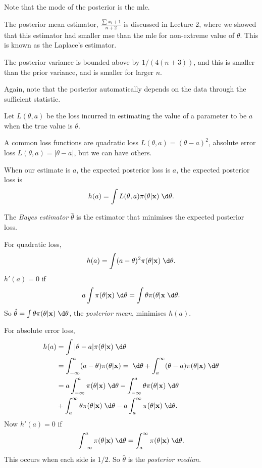\documentclass[a4paper]{article}
\begin{document}
Note that the mode of the posterior is the mle.

The posterior mean estimator, $\frac{\sum x_i + 1}{n + 2}$ is discussed in Lecture 2, where we showed that this estimator had smaller mse than the mle for non-extreme value of $\theta$. This is known as the Laplace's estimator.

The posterior variance is bounded above by $1/(4(n + 3))$, and this is smaller than the prior variance, and is smaller for larger $n$.

Again, note that the posterior automatically depends on the data through the sufficient statistic.

Let $L(\theta, a)$ be the loss incurred in estimating the value of a parameter to be $a$ when the true value is $\theta$.

A common loss functions are quadratic loss $L(\theta, a) = (\theta - a)^2$, absolute error loss $L(\theta, a) = |\theta - a|$, but we can have others.

When our estimate is $a$, the expected posterior loss is $a$, the expected posterior loss is
\[
  h(a) = \int L(\theta, a)\pi(\theta|\mathbf{x})\;\d \theta.
\]
\begin{defi}
  The \emph{Bayes estimator} $\hat{\theta}$ is the estimator that minimises the expected posterior loss.
\end{defi}

For quadratic loss,
\[
  h(a) = \int (a - \theta)^2 \pi(\theta|\mathbf{x})\;\d \theta.
\]
$h'(a) = 0$ if 
\[
  a\int \pi (\theta|\mathbf{x})\;\d \theta = \int \theta \pi(\theta|\mathbf{x}\;\d \theta.
\]
So $\hat{\theta} = \int \theta\pi(\theta|\mathbf{x})\;\d \theta$, the \emph{posterior mean}, minimises $h(a)$.

For absolute error loss,
\begin{align*}
  h(a) &= \int |\theta - a|\pi(\theta|\mathbf{x})\;\d \theta\\
  &= \int_{-\infty}^a (a - \theta)\pi(\theta|\mathbf{x}) = \;\d \theta + \int_a^\infty (\theta - a)\pi(\theta|\mathbf{x})\;\d \theta\\
  &= a\int_{-\infty}^a \pi(\theta|\mathbf{x})\;\d \theta - \int_{-\infty}^a\theta\pi(\theta|\mathbf{x})\;\d \theta\\
  &+ \int_a^\infty \theta\pi(\theta|\mathbf{x})\;\d \theta - a\int_a^\infty \pi(\theta|\mathbf{x})\;\d \theta.
\end{align*}
Now $h'(a) = 0$ if
\[
  \int_{-\infty}^a \pi(\theta|\mathbf{x})\;\d \theta = \int_a^\infty \pi(\theta|\mathbf{x})\;\d \theta.
\]
This occurs when each side is $1/2$. So $\hat{\theta}$ is the \emph{posterior median}.
\end{document}
